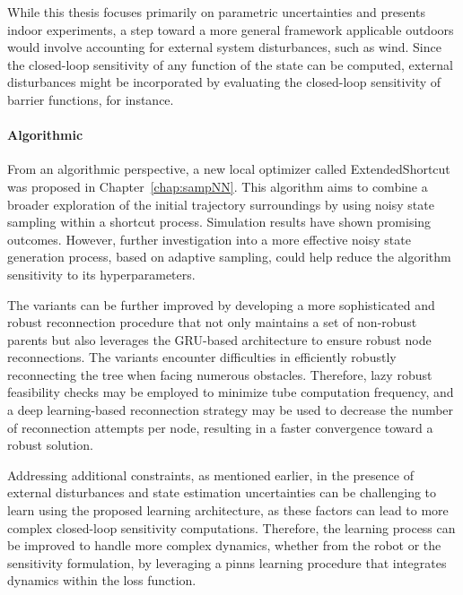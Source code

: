 While this thesis focuses primarily on parametric uncertainties and presents indoor experiments, a step toward a more general framework applicable outdoors would involve accounting for external system disturbances, such as wind.
Since the closed-loop sensitivity of any function of the state can be computed, external disturbances might be incorporated by evaluating the closed-loop sensitivity of barrier functions, for instance.

\paragraph{Algorithmic}

From an algorithmic perspective, a new local optimizer called ExtendedShortcut was proposed in Chapter~\ref{chap:sampNN}. 
This algorithm aims to combine a broader exploration of the initial trajectory surroundings by using noisy state sampling within a shortcut process. 
Simulation results have shown promising outcomes. 
However, further investigation into a more effective noisy state generation process, based on adaptive sampling, could help reduce the algorithm sensitivity to its hyperparameters.

The  variants can be further improved by developing a more sophisticated and robust reconnection procedure that not only maintains a set of non-robust parents but also leverages the GRU-based architecture to ensure robust node reconnections.
The  variants encounter difficulties in efficiently robustly reconnecting the tree when facing numerous obstacles. 
Therefore, lazy robust feasibility checks may be employed to minimize tube computation frequency, and a deep learning-based reconnection strategy may be used to decrease the number of reconnection attempts per node, resulting in a faster convergence toward a robust solution.

Addressing additional constraints, as mentioned earlier, in the presence of external disturbances and state estimation uncertainties can be challenging to learn using the proposed learning architecture, as these factors can lead to more complex closed-loop sensitivity computations.
Therefore, the learning process can be improved to handle more complex dynamics, whether from the robot or the sensitivity formulation, by leveraging a \gls{pinns} learning procedure that integrates  dynamics within the loss function.

